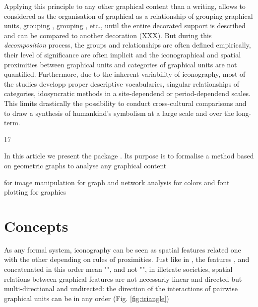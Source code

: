 \documentclass[article]{jss}
\begin{document}
Applying this principle to any other graphical content than a writing, allows to considered as the organisation of graphical as a relationship of  grouping graphical units,  grouping ,  grouping , etc., until the entire decorated support is described and can be compared to another decoration (XXX). But during this \emph{decomposition} process, the groups and relationships are often defined empirically, their level of significance are often implicit and the iconographical and spatial proximities between graphical units and categories of graphical units are not quantified. Furthermore, due to the inherent variability of iconography, most of the studies developp proper descriptive vocabularies, singular relationships of categories, idosyncratic methods in a site-dependend or period-dependend scales. This limits drastically the possibility to conduct cross-cultural comparisons and to draw a synthesis of humankind's symbolism at a large scale and over the long-term. 


\begin{Schunk}
\begin{Soutput}
[1] 17
\end{Soutput}
\end{Schunk}

In this article we present the  package . Its purpose is to formalise a method based on geometric graphs to analyse any graphical content  

 for image manipulation \citep{Ooms18}
 \citep{Csardi06} for graph and network analysis
 for colors and font plotting \citep{R19}
 for graphics \citep{R19}


\section[Concepts]{Concepts} \label{sec:concepts}

As any formal system, iconography can be seen as spatial features related one with the other depending on rules of proximities. Just like in , the features ,  and  concatenated in this order mean "", and not "", in illetrate societies, spatial relations between graphical features are not necessarly linear and directed but multi-directional and undirected: the direction of the interactions of pairwise graphical units can be in any order (Fig. \ref{fig:triangle})
\end{document}
